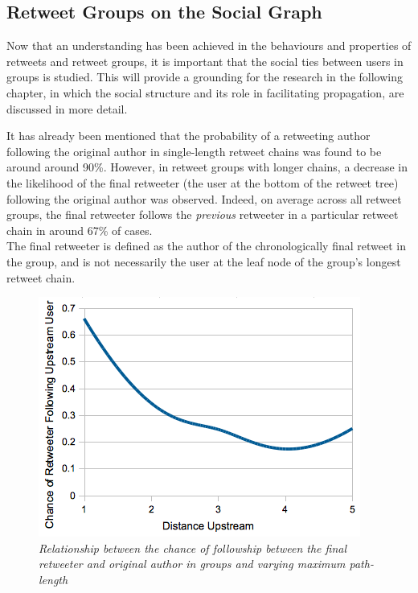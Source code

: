 \subsection{Retweet Groups on the Social Graph}
Now that an understanding has been achieved in the behaviours and properties of retweets and retweet groups, it is important that the social ties between users in groups is studied. This will provide a grounding for the research in the following chapter, in which the social structure and its role in facilitating propagation, are discussed in more detail.

It has already been mentioned that the probability of a retweeting author following the original author in single-length retweet chains was found to be around around 90\%. However, in retweet groups with longer chains, a decrease in the likelihood of the final retweeter (the user at the bottom of the retweet tree) following the original author was observed. Indeed, on average across all retweet groups, the final retweeter follows the \textit{previous} retweeter in a particular retweet chain in around 67\% of cases.\\
The final retweeter is defined as the author of the chronologically final retweet in the group, and is not necessarily the user at the leaf node of the group's longest retweet chain.

\begin{figure}[h]
\centering
\includegraphics[scale=0.6]{3.Chapter1/Media/following-possibility.png} 
\caption{\textit{Relationship between the chance of followship between the final retweeter and original author in groups and varying maximum path-length}}
\label{fig:followingchance_pathlength}
\end{figure}

